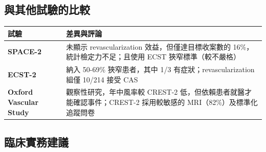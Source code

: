 \documentclass[12pt,a4paper]{article}
\begin{document}
\subsection{與其他試驗的比較}

\begin{longtable}{p{3cm}p{11cm}}
\toprule
\textbf{試驗} & \textbf{差異與評論} \\
\midrule
\endfirsthead

\bottomrule
\endfoot

\textbf{SPACE-2} & 未顯示 revascularization 效益，但僅達目標收案數的 16\%，統計檢定力不足；且使用 ECST 狹窄標準（較不嚴格） \\
\midrule
\textbf{ECST-2} & 納入 50-69\% 狹窄患者，其中 1/3 有症狀；revascularization 組僅 10/214 接受 CAS \\
\midrule
\textbf{Oxford Vascular Study} & 觀察性研究，年中風率較 CREST-2 低，但依賴患者就醫才能確認事件；CREST-2 採用較敏感的 MRI（82\%）及標準化追蹤問卷 \\
\bottomrule
\end{longtable}

\subsection{臨床實務建議}
\end{document}
